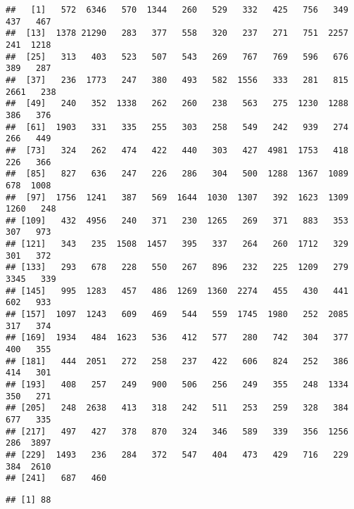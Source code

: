 \documentclass[
]{article}
\newenvironment{Shaded}{\begin{snugshade}}{\end{snugshade}}
\newcommand{\KeywordTok}[1]{\textcolor[rgb]{0.13,0.29,0.53}{\textbf{#1}}}
\newcommand{\NormalTok}[1]{#1}
\newcommand{\OperatorTok}[1]{\textcolor[rgb]{0.81,0.36,0.00}{\textbf{#1}}}
\begin{document}
\begin{verbatim}
##   [1]   572  6346   570  1344   260   529   332   425   756   349   437   467
##  [13]  1378 21290   283   377   558   320   237   271   751  2257   241  1218
##  [25]   313   403   523   507   543   269   767   769   596   676   389   287
##  [37]   236  1773   247   380   493   582  1556   333   281   815  2661   238
##  [49]   240   352  1338   262   260   238   563   275  1230  1288   386   376
##  [61]  1903   331   335   255   303   258   549   242   939   274   266   449
##  [73]   324   262   474   422   440   303   427  4981  1753   418   226   366
##  [85]   827   636   247   226   286   304   500  1288  1367  1089   678  1008
##  [97]  1756  1241   387   569  1644  1030  1307   392  1623  1309  1260   248
## [109]   432  4956   240   371   230  1265   269   371   883   353   307   973
## [121]   343   235  1508  1457   395   337   264   260  1712   329   301   372
## [133]   293   678   228   550   267   896   232   225  1209   279  3345   339
## [145]   995  1283   457   486  1269  1360  2274   455   430   441   602   933
## [157]  1097  1243   609   469   544   559  1745  1980   252  2085   317   374
## [169]  1934   484  1623   536   412   577   280   742   304   377   400   355
## [181]   444  2051   272   258   237   422   606   824   252   386   414   301
## [193]   408   257   249   900   506   256   249   355   248  1334   350   271
## [205]   248  2638   413   318   242   511   253   259   328   384   677   335
## [217]   497   427   378   870   324   346   589   339   356  1256   286  3897
## [229]  1493   236   284   372   547   404   473   429   716   229   384  2610
## [241]   687   460
\end{verbatim}

\begin{Shaded}
\end{Shaded}

\begin{verbatim}
## [1] 88
\end{verbatim}

\begin{Shaded}
\end{Shaded}
\end{document}

